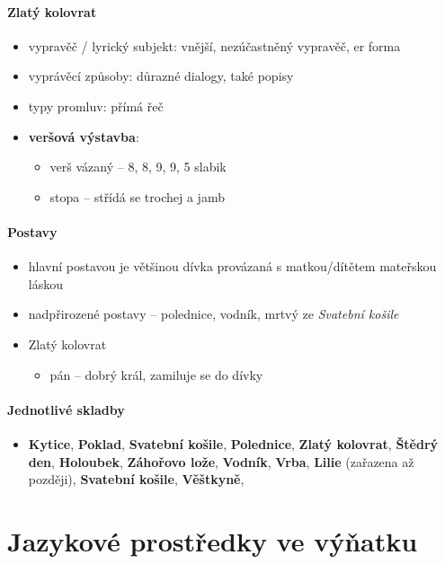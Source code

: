 \documentclass[10pt,a4paper]{article}
\begin{document}
\paragraph{Zlatý kolovrat}
\begin{itemize}
\item vypravěč / lyrický subjekt: vnější, nezúčastněný vypravěč, er forma
\item vyprávěcí způsoby: důrazné dialogy, také popisy
\item typy promluv: přímá řeč
\item \textbf{veršová výstavba}:
	\begin{itemize}
	\item verš vázaný -- 8, 8, 9, 9, 5 slabik
	\item stopa -- střídá se trochej a jamb
	\end{itemize}
\end{itemize}

\paragraph{Postavy}
\begin{itemize}
\item hlavní postavou je většinou dívka provázaná s matkou/dítětem mateřskou láskou
\item nadpřirozené postavy -- polednice, vodník, mrtvý ze \textit{Svatební košile}
\item Zlatý kolovrat
	\begin{itemize}
	\item pán -- dobrý král, zamiluje se do dívky
	\end{itemize}	 
\end{itemize}

\paragraph{Jednotlivé skladby}
\begin{itemize}
\item 
\textbf{Kytice}, 
\textbf{Poklad}, 
\textbf{Svatební košile}, 
\textbf{Polednice}, 
\textbf{Zlatý kolovrat}, 
\textbf{Štědrý den}, 
\textbf{Holoubek}, 
\textbf{Záhořovo lože}, 
\textbf{Vodník}, 
\textbf{Vrba}, 
\textbf{Lilie} (zařazena až později), 
\textbf{Svatební košile}, 
\textbf{Věštkyně}, 
\end{itemize}


\section*{Jazykové prostředky ve výňatku}
\end{document}
